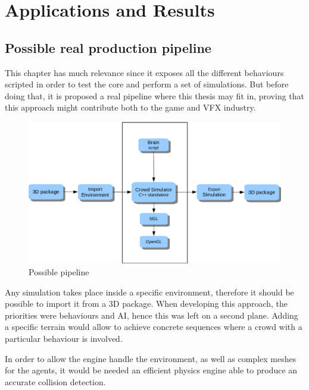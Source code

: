 \ifx\isEmbedded\undefined

\graphicspath{{../img/}}

\fi

\chapter{Applications and Results}
\label{chap:applications_and_results}

\section{Possible real production pipeline}

This chapter has much relevance since it exposes all the different behaviours scripted in order to test the core and perform a set of simulations. But before doing that, it is proposed a real pipeline where this thesis may fit in, proving that this approach might contribute both to the game and VFX industry.

\begin{figure}[!htb]
  \centering
  \includegraphics[scale=0.5]{pipeline.eps}
  \caption{Possible pipeline}
  \label{fig:classDiag}
\end{figure}

Any simulation takes place inside a specific environment, therefore it should be possible to import it from a 3D package. When developing this approach, the priorities were behaviours and AI, hence this was left on a second plane. Adding a specific terrain would allow to achieve concrete sequences where a crowd with a particular behaviour is involved.

In order to allow the engine handle the environment, as well as complex meshes for the agents, it would be needed an efficient physics engine able to produce an accurate collision detection. 

